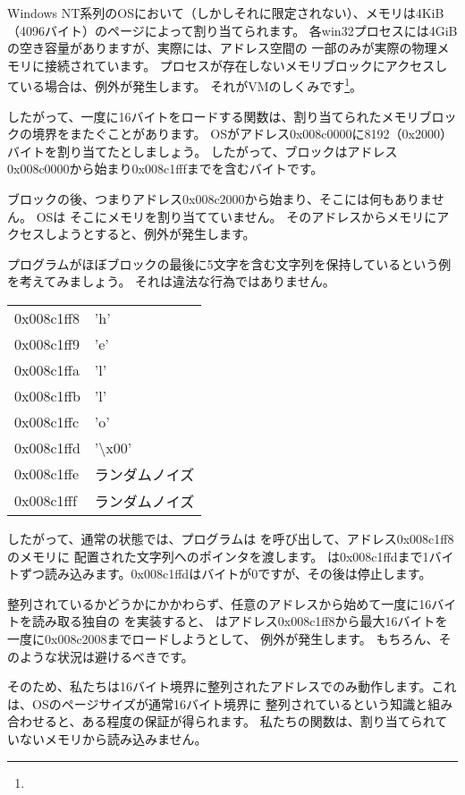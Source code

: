 \gls{Windows NT}系列の\ac{OS}において（しかしそれに限定されない）、メモリは4KiB（4096バイト）のページによって割り当てられます。
各win32プロセスには4GiBの空き容量がありますが、実際には、アドレス空間の
一部のみが実際の物理メモリに接続されています。
プロセスが存在しないメモリブロックにアクセスしている場合は、例外が発生します。
それが\ac{VM}のしくみです\footnote{\URLPAGE}。

したがって、一度に16バイトをロードする関数は、割り当てられたメモリブロックの境界をまたぐことがあります。 
\ac{OS}がアドレス0x008c0000に8192（0x2000）バイトを割り当てたとしましょう。
したがって、ブロックはアドレス0x008c0000から始まり0x008c1fffまでを含むバイトです。

ブロックの後、つまりアドレス0x008c2000から始まり、そこには何もありません。 \ac{OS}は
そこにメモリを割り当てていません。
そのアドレスからメモリにアクセスしようとすると、例外が発生します。

プログラムがほぼブロックの最後に5文字を含む文字列を保持しているという例を考えてみましょう。
それは違法な行為ではありません。

\begin{center}
  \begin{tabular}{ | l | l | }
    \hline
        0x008c1ff8 & 'h' \\
        0x008c1ff9 & 'e' \\
        0x008c1ffa & 'l' \\
        0x008c1ffb & 'l' \\
        0x008c1ffc & 'o' \\
        0x008c1ffd & '\textbackslash{}x00' \\
        0x008c1ffe & ランダムノイズ \\
        0x008c1fff & ランダムノイズ \\
    \hline
  \end{tabular}
\end{center}

したがって、通常の状態では、プログラムは \strlen を呼び出して、アドレス0x008c1ff8のメモリに
配置された文字列へのポインタを渡します。 
\strlen は0x008c1ffdまで1バイトずつ読み込みます。0x008c1ffdはバイトが0ですが、その後は停止します。

整列されているかどうかにかかわらず、任意のアドレスから始めて一度に16バイトを読み取る独自の \strlen を実装すると、
\MOVDQU はアドレス0x008c1ff8から最大16バイトを一度に0x008c2008までロードしようとして、
例外が発生します。
もちろん、そのような状況は避けるべきです。

そのため、私たちは16バイト境界に整列されたアドレスでのみ動作します。これは、\ac{OS}のページサイズが通常16バイト境界に
整列されているという知識と組み合わせると、ある程度の保証が得られます。
私たちの関数は、割り当てられていないメモリから読み込みません。

